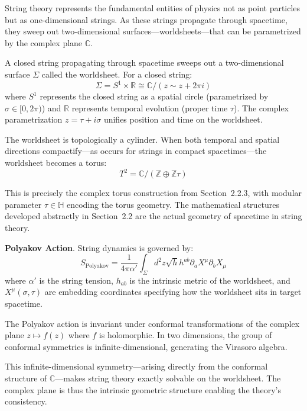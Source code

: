 String theory represents the fundamental entities of physics not as point particles but as one-dimensional strings. As these strings propagate through spacetime, they sweep out two-dimensional surfaces—worldsheets—that can be parametrized by the complex plane $\mathbb{C}$.

\begin{Definition} \label{const:worldsheet-param}
    A closed string propagating through spacetime sweeps out a two-dimensional surface $\Sigma$ called the worldsheet. For a closed string:
    \[
        \Sigma = S^1 \times \mathbb{R} \cong \mathbb{C}/(z \sim z + 2\pi i)
    \]
    where $S^1$ represents the closed string as a spatial circle (parametrized by $\sigma \in [0, 2\pi)$) and $\mathbb{R}$ represents temporal evolution (proper time $\tau$). The complex parametrization $z = \tau + i\sigma$ unifies position and time on the worldsheet.
\end{Definition}

The worldsheet is topologically a cylinder. When both temporal and spatial directions compactify—as occurs for strings in compact spacetimes—the worldsheet becomes a torus:
\[
    T^2 = \mathbb{C}/(\mathbb{Z} \oplus \mathbb{Z}\tau)
\]

This is precisely the complex torus construction from Section~2.2.3, with modular parameter $\tau \in \mathbb{H}$ encoding the torus geometry. The mathematical structures developed abstractly in Section~2.2 are the actual geometry of spacetime in string theory.

\textbf{Polyakov Action}. String dynamics is governed by:
\[
    S_{\text{Polyakov}} = \frac{1}{4\pi\alpha'} \int_\Sigma d^2z \sqrt{h} h^{ab} \partial_a X^\mu \partial_b X_\mu
\]
where $\alpha'$ is the string tension, $h_{ab}$ is the intrinsic metric of the worldsheet, and $X^\mu(\sigma,\tau)$ are embedding coordinates specifying how the worldsheet sits in target spacetime.

\begin{Theorem} \label{thm:conformal-invariance}
    The Polyakov action is invariant under conformal transformations of the complex plane $z \mapsto f(z)$ where $f$ is holomorphic. In two dimensions, the group of conformal symmetries is infinite-dimensional, generating the Virasoro algebra.
\end{Theorem}

This infinite-dimensional symmetry—arising directly from the conformal structure of $\mathbb{C}$—makes string theory exactly solvable on the worldsheet. The complex plane is thus the intrinsic geometric structure enabling the theory's consistency.

